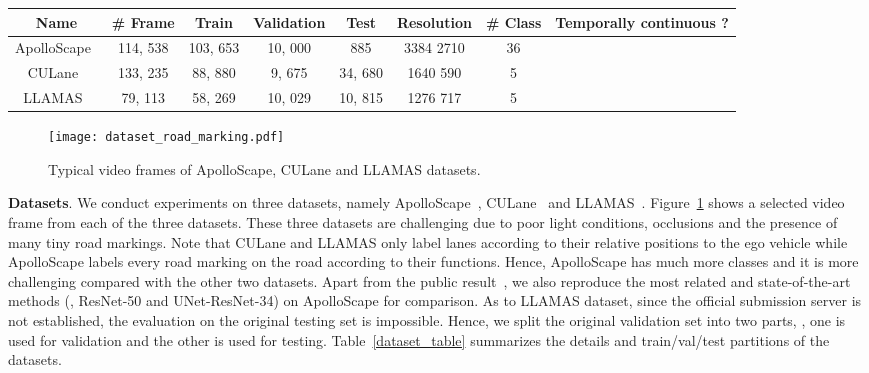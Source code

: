 \documentclass[10pt,twocolumn,letterpaper]{article}
\begin{document}
\begin{table*}[!t]
\caption{Basic information of three road marking segmentation datasets.}
\vskip 0.1cm
\label{dataset_table}
\centering
\small{
\begin{tabular}{c|c|c|c|c|c|c|c}
\hline
Name & \# Frame & Train & Validation & Test & Resolution & \# Class & Temporally continuous ? \\
\hline
\hline
ApolloScape~\cite{huang2018apolloscape} & 114, 538 & 103, 653 & 10, 000 & 885 & 3384  2710 & 36 &  \\
CULane~\cite{pan2017spatial} & 133, 235 & 88, 880 & 9, 675 & 34, 680 & 1640  590 & 5 &  \\
LLAMAS~\cite{llamas2019} & 79, 113 & 58, 269 & 10, 029 & 10, 815 & 1276  717 & 5 &  \\
\hline
\end{tabular}
}
\vspace{-4ex}
\end{table*}

\begin{figure}[t]
  \centering
  \texttt{[image: dataset\_road\_marking.pdf]}
  \vskip -0.2cm
  \caption{Typical video frames of ApolloScape, CULane and LLAMAS datasets.}
  \centering
  \vskip -0.5cm
  \label{fig:dataset}
\end{figure}

\vspace{0.1cm}
\noindent
\textbf{Datasets}.
We conduct experiments on three datasets, namely ApolloScape~\cite{huang2018apolloscape}, CULane~\cite{pan2017spatial} and LLAMAS~\cite{llamas2019}.
Figure~\ref{fig:dataset} shows a selected video frame from each of the three datasets.
These three datasets are challenging due to poor light conditions, occlusions and the presence of many tiny road markings. 
Note that CULane and LLAMAS only label lanes according to their relative positions to the ego vehicle while ApolloScape labels every road marking on the road according to their functions. Hence, ApolloScape has much more classes and it is more challenging compared with the other two datasets. Apart from the public result~\cite{huang2018apolloscape}, we also reproduce the most related and state-of-the-art methods (\eg, ResNet-50 and UNet-ResNet-34) on ApolloScape for comparison. As to LLAMAS dataset, since the official submission server is not established, the evaluation on the original testing set is impossible. Hence, we split the original validation set into two parts, \ie, one is used for validation and the other is used for testing. Table~\ref{dataset_table} summarizes the details and train/val/test partitions of the datasets.
\end{document}
